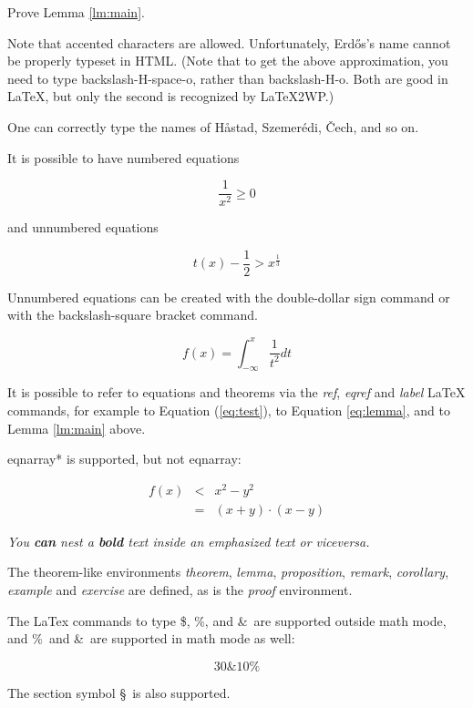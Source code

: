 \documentclass[12pt]{article}
\begin{document}
\begin{exercise}[Advanced] Prove Lemma \ref{lm:main}. \end{exercise}

Note that accented characters are allowed. Unfortunately,
Erd\H os's name cannot be properly typeset in HTML.
(Note that to get the above approximation, you need to type
backslash-H-space-o, rather than backslash-H-{o}. Both are
good in LaTeX, but only the second is recognized by LaTeX2WP.)

One can correctly type the names of H\aa stad, Szemer\'edi,
\v{C}ech, and so on.

It is possible to have numbered equations

\begin{equation} \label{eq:test} \frac 1 {x^2} \ge 0 \end{equation}

and unnumbered equations

$$ t(x) - \frac 12 > x^{\frac 13} $$

Unnumbered equations can be created with the double-dollar sign 
command or with the backslash-square bracket command.

\[ f(x) = \int_{-\infty}^{x} \frac 1 {t^2} dt \]

It is possible to refer to equations and
theorems via the {\em ref}, {\em eqref} and {\em label} LaTeX
commands, for example to Equation (\ref{eq:test}),
to Equation \eqref{eq:lemma},
and to Lemma \ref{lm:main} above.

eqnarray* is supported, but not eqnarray:


\begin{eqnarray*}
f(x) & <  & x^2 - y^2\\
& = & (x+y) \cdot (x-y)
\end{eqnarray*}

{\em You {\bf can} nest a {\bf bold} text inside an emphasized
text or viceversa.}



The theorem-like environments {\em theorem}, {\em lemma},
{\em proposition}, {\em remark}, {\em corollary}, {\em example}
and {\em exercise} are defined, as is the {\em proof} environment.

The LaTex commands to type \$, \%, and \&\ are supported outside
math mode, and \%\ and \&\ are supported in math mode as well:

\[  30 \&  10 \% \]

The section symbol \S\ is also supported.
\end{document}
